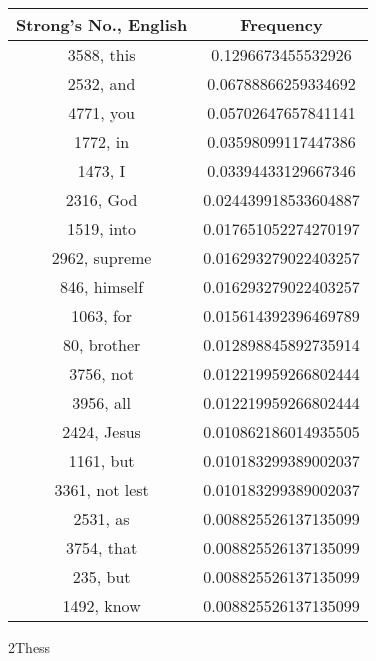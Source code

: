 \documentclass[12pt,letterpaper]{article}
\begin{document}
 \begin{longtable}{|c|c|}
\hline
 Strong's No., English & Frequency \\ \hline  
3588, this & 0.1296673455532926\\ \hline 
 2532, and & 0.06788866259334692\\ \hline 
 4771, you & 0.05702647657841141\\ \hline 
 1772, in & 0.03598099117447386\\ \hline 
 1473, I & 0.03394433129667346\\ \hline 
 2316, God & 0.024439918533604887\\ \hline 
 1519, into & 0.017651052274270197\\ \hline 
 2962, supreme & 0.016293279022403257\\ \hline 
 846, himself & 0.016293279022403257\\ \hline 
 1063, for & 0.015614392396469789\\ \hline 
 80, brother & 0.012898845892735914\\ \hline 
 3756, not & 0.012219959266802444\\ \hline 
 3956, all & 0.012219959266802444\\ \hline 
 2424, Jesus & 0.010862186014935505\\ \hline 
 1161, but & 0.010183299389002037\\ \hline 
 3361, not lest & 0.010183299389002037\\ \hline 
 2531, as & 0.008825526137135099\\ \hline 
 3754, that & 0.008825526137135099\\ \hline 
 235, but & 0.008825526137135099\\ \hline 
 1492, know & 0.008825526137135099\\ \hline 
\end{longtable} 
 

2Thess
\end{document}
